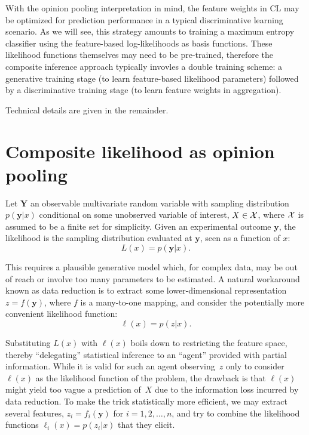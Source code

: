 \documentclass[english]{scrartcl}
\def\y{{\mathbf{y}}}
\begin{document}
With the opinion pooling interpretation in mind, the feature weights in CL may be optimized for prediction performance in a typical discriminative learning scenario. As we will see, this strategy amounts to training a maximum entropy classifier using the feature-based log-likelihoods as basis functions. These likelihood functions themselves may need to be pre-trained, therefore the composite inference approach typically invovles a double training scheme: a generative training stage (to learn feature-based likelihood parameters) followed by a discriminative training stage (to learn feature weights in aggregation).

Technical details are given in the remainder.



\section{Composite likelihood as opinion pooling}
\label{sec:log_pool}

Let $\mathbf{Y}$ an observable multivariate random variable with sampling distribution $p(\y|x)$ conditional on some unobserved variable of interest, $X\in{\cal X}$, where ${\cal X}$ is assumed to be a finite set for simplicity. Given an experimental outcome $\y$, the likelihood is the sampling distribution evaluated at $\y$, seen as a function of $x$:
$$
L(x) = p(\y|x)
.
$$

This requires a plausible generative model which, for complex data, may be out of reach or involve too many parameters to be estimated. A natural workaround known as data reduction is to extract some lower-dimensional representation $z=f(\y)$, where $f$ is a many-to-one mapping, and consider the potentially more convenient likelihood function:
$$
\ell(x) = p(z|x)
.
$$

Substituting $L(x)$ with $\ell(x)$ boils down to restricting the feature space, thereby  ``delegating'' statistical inference to an ``agent'' provided with partial information. While it is valid for such an agent observing~$z$ only to consider $\ell(x)$ as the likelihood function of the problem, the drawback is that $\ell(x)$ might yield too vague a prediction of~$X$ due to the information loss incurred by data reduction. To make the trick statistically more efficient, we may extract several features, $z_i=f_i(\y)$ for $i=1,2,\ldots,n$, and try to combine the likelihood functions $\ell_i(x) = p(z_i|x)$ that they elicit.
\end{document}

